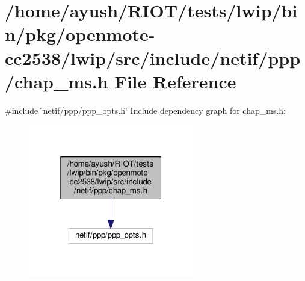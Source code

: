 \hypertarget{openmote-cc2538_2lwip_2src_2include_2netif_2ppp_2chap__ms_8h}{}\section{/home/ayush/\+R\+I\+O\+T/tests/lwip/bin/pkg/openmote-\/cc2538/lwip/src/include/netif/ppp/chap\+\_\+ms.h File Reference}
\label{openmote-cc2538_2lwip_2src_2include_2netif_2ppp_2chap__ms_8h}
{\ttfamily \#include \char`\"{}netif/ppp/ppp\+\_\+opts.\+h\char`\"{}}\newline
Include dependency graph for chap\+\_\+ms.\+h\+:
\nopagebreak
\begin{figure}[H]
\begin{center}
\leavevmode
\includegraphics[width=205pt]{openmote-cc2538_2lwip_2src_2include_2netif_2ppp_2chap__ms_8h__incl}
\end{center}
\end{figure}
